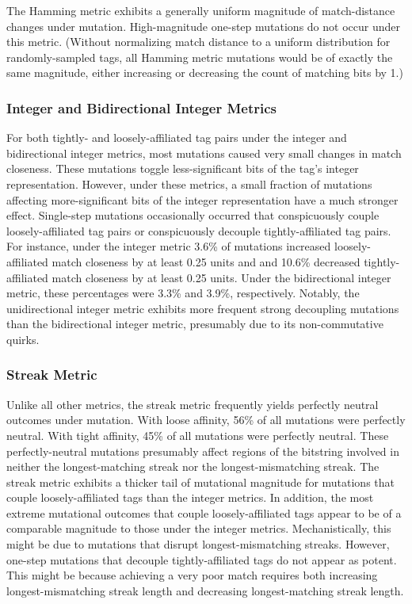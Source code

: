 The Hamming metric exhibits a generally uniform magnitude of match-distance changes under mutation.
High-magnitude one-step mutations do not occur under this metric.
(Without normalizing match distance to a uniform distribution for randomly-sampled tags, all Hamming metric mutations would be of exactly the same magnitude, either increasing or decreasing the count of matching bits by 1.)

\subsubsection{Integer and Bidirectional Integer Metrics}

For both tightly- and loosely-affiliated tag pairs under the integer and bidirectional integer metrics, most mutations caused very small changes in match closeness.
These mutations toggle less-significant bits of the tag's integer representation.
However, under these metrics, a small fraction of mutations affecting more-significant bits of the integer representation have a much stronger effect.
Single-step mutations occasionally occurred that conspicuously couple loosely-affiliated tag pairs or conspicuously decouple tightly-affiliated tag pairs.
For instance, under the integer metric 3.6\% of mutations increased loosely-affiliated match closeness by at least 0.25 units and and 10.6\% decreased tightly-affiliated match closeness by at least 0.25 units.
Under the bidirectional integer metric, these percentages were 3.3\% and 3.9\%, respectively.
Notably, the unidirectional integer metric exhibits more frequent strong decoupling mutations than the bidirectional integer metric, presumably due to its non-commutative quirks.

\subsubsection{Streak Metric}

Unlike all other metrics, the streak metric frequently yields perfectly neutral outcomes under mutation.
With loose affinity, 56\% of all mutations were perfectly neutral.
With tight affinity, 45\% of all mutations were perfectly neutral.
These perfectly-neutral mutations presumably affect regions of the bitstring involved in neither the longest-matching streak nor the longest-mismatching streak.
The streak metric exhibits a thicker tail of mutational magnitude for mutations that couple loosely-affiliated tags than the integer metrics.
In addition, the most extreme mutational outcomes that couple loosely-affiliated tags appear to be of a comparable magnitude to those under the integer metrics.
Mechanistically, this might be due to mutations that disrupt longest-mismatching streaks.
However, one-step mutations that decouple tightly-affiliated tags do not appear as potent.
This might be because achieving a very poor match requires both increasing longest-mismatching streak length and decreasing longest-matching streak length.

